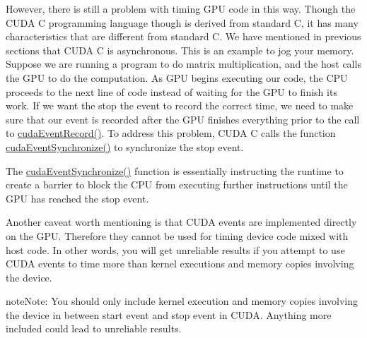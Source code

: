 \documentclass[letterpaper,10pt,openany,oneside]{sphinxmanual}
\begin{document}
However, there is still a problem with timing GPU code in this way. Though the CUDA C programming language though is derived from standard C, it has many characteristics that are different from standard C. We have mentioned in previous sections that CUDA C is asynchronous. This is an example to jog your memory. Suppose we are running a program to do matrix multiplication, and the host calls the GPU to do the computation. As GPU begins executing our code, the CPU proceeds to the next line of code instead of waiting for the GPU to finish its work. If we want the stop the event to record the correct time, we need to make sure that our event is recorded after the GPU finishes everything prior to the call to \href{http://developer.download.nvidia.com/compute/cuda/4\_2/rel/toolkit/docs/online/group\_\_CUDART\_\_EVENT\_ga324d5ce3fbf46899b15e5e42ff9cfa5.html\#ga324d5ce3fbf46899b15e5e42ff9cfa5}{cudaEventRecord()}. To address this problem, CUDA C calls the function \href{http://developer.download.nvidia.com/compute/cuda/4\_2/rel/toolkit/docs/online/group\_\_CUDART\_\_EVENT\_g08241bcf5c5cb686b1882a8492f1e2d9.html\#g08241bcf5c5cb686b1882a8492f1e2d9}{cudaEventSynchronize()} to synchronize the stop event.

The \href{http://developer.download.nvidia.com/compute/cuda/4\_2/rel/toolkit/docs/online/group\_\_CUDART\_\_EVENT\_g08241bcf5c5cb686b1882a8492f1e2d9.html\#g08241bcf5c5cb686b1882a8492f1e2d9}{cudaEventSynchronize()} function is essentially instructing the runtime to create a barrier to block the CPU from executing further instructions until the GPU has reached the stop event.

Another caveat worth mentioning is that CUDA events are implemented directly on the GPU. Therefore they cannot be used for timing device code mixed with host code. In other words, you will get unreliable results if you attempt to use CUDA events to time more than kernel executions and memory copies involving the device.

\begin{notice}{note}{Note:}
You should only include kernel execution and memory copies involving the device in between start event and stop event in CUDA. Anything more included could lead to unreliable results.
\end{notice}
\end{document}
